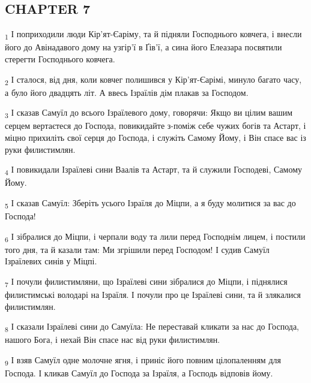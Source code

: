\subsection{CHAPTER 7}
\begin{tcolorbox}
\textsubscript{1} І поприходили люди Кір'ят-Єаріму, та й підняли Господнього ковчега, і внесли його до Авінадавого дому на узгір'ї в Ґів'ї, а сина його Елеазара посвятили стерегти Господнього ковчега.
\end{tcolorbox}
\begin{tcolorbox}
\textsubscript{2} І сталося, від дня, коли ковчег полишився у Кір'ят-Єарімі, минуло багато часу, а було його двадцять літ. А ввесь Ізраїлів дім плакав за Господом.
\end{tcolorbox}
\begin{tcolorbox}
\textsubscript{3} І сказав Самуїл до всього Ізраїлевого дому, говорячи: Якщо ви цілим вашим серцем вертаєтеся до Господа, повикидайте з-поміж себе чужих богів та Астарт, і міцно прихиліть свої серця до Господа, і служіть Самому Йому, і Він спасе вас із руки филистимлян.
\end{tcolorbox}
\begin{tcolorbox}
\textsubscript{4} І повикидали Ізраїлеві сини Ваалів та Астарт, та й служили Господеві, Самому Йому.
\end{tcolorbox}
\begin{tcolorbox}
\textsubscript{5} І сказав Самуїл: Зберіть усього Ізраїля до Міцпи, а я буду молитися за вас до Господа!
\end{tcolorbox}
\begin{tcolorbox}
\textsubscript{6} І зібралися до Міцпи, і черпали воду та лили перед Господнім лицем, і постили того дня, та й казали там: Ми згрішили перед Господом! І судив Самуїл Ізраїлевих синів у Міцпі.
\end{tcolorbox}
\begin{tcolorbox}
\textsubscript{7} І почули филистимляни, що Ізраїлеві сини зібралися до Міцпи, і піднялися филистимські володарі на Ізраїля. І почули про це Ізраїлеві сини, та й злякалися филистимлян.
\end{tcolorbox}
\begin{tcolorbox}
\textsubscript{8} І сказали Ізраїлеві сини до Самуїла: Не переставай кликати за нас до Господа, нашого Бога, і нехай Він спасе нас від руки филистимлян.
\end{tcolorbox}
\begin{tcolorbox}
\textsubscript{9} І взяв Самуїл одне молочне ягня, і приніс його повним цілопаленням для Господа. І кликав Самуїл до Господа за Ізраїля, а Господь відповів йому.
\end{tcolorbox}
